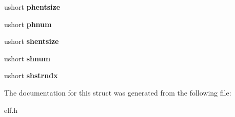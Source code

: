 \begin{DoxyCompactItemize}
ushort {\bfseries phentsize}
\item 
\mbox{\label{structelfhdr_a3eff58d58a3ee83aa53d7ffdebdb6b5b}} 
ushort {\bfseries phnum}
\item 
\mbox{\label{structelfhdr_aeedc5375e3f67e8dda6351e0e80b8e02}} 
ushort {\bfseries shentsize}
\item 
\mbox{\label{structelfhdr_aebf9526933b9f0502bdbafacce3734c1}} 
ushort {\bfseries shnum}
\item 
\mbox{\label{structelfhdr_a84f3d7712c99bfea3f4be42728dc0a0e}} 
ushort {\bfseries shstrndx}
\end{DoxyCompactItemize}


The documentation for this struct was generated from the following file\+:\begin{DoxyCompactItemize}
\item 
elf.\+h\end{DoxyCompactItemize}
